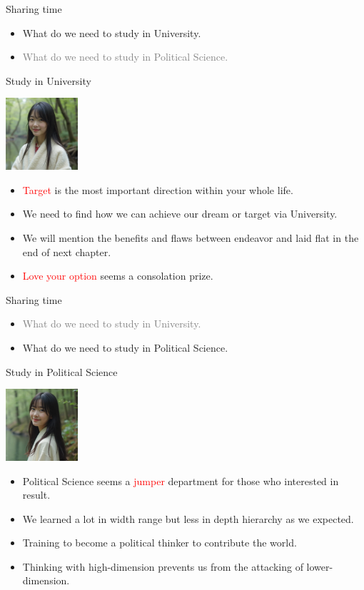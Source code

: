 \documentclass{beamer}
\begin{document}
\begin{frame}{Sharing time}
\begin{itemize}
\item What do we need to study in University.
\item \textcolor{gray}{What do we need to study in Political Science.}
\end{itemize}
\end{frame}
\begin{frame}{Study in University}
\begin{center}
\includegraphics[width=0.2\textwidth]{target.png}
\end{center}
\begin{itemize}
\item \textcolor{red}{Target} is the most important direction within your whole life.
\item We need to find how we can achieve our dream or target via University.
\item We will mention the benefits and flaws between endeavor and laid flat in the end of next chapter.
\item \textcolor{red}{Love your option} seems a consolation prize.
\end{itemize}
\end{frame}
\begin{frame}{Sharing time}
\begin{itemize}
\item \textcolor{gray}{What do we need to study in University.}
\item What do we need to study in Political Science.
\end{itemize}
\end{frame}
\begin{frame}{Study in Political Science}
\begin{center}
\includegraphics[width=0.2\textwidth]{motivate.png}
\end{center}
\begin{itemize}
\item Political Science seems a \textcolor{red}{jumper} department for those who interested in result.
\item We learned a lot in width range but less in depth hierarchy as we expected.
\item Training to become a political thinker to contribute the world.
\item Thinking with high-dimension prevents us from the attacking of lower-dimension.
\end{itemize}
\end{frame}
\end{document}
